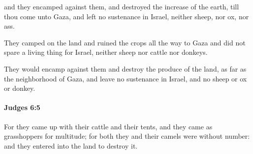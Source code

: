 			\begin{versebox}
					\item[BHS] 
					\item[ASV] and they encamped against them, and destroyed the increase of the earth, till thou come unto Gaza, and left no sustenance in Israel, neither sheep, nor ox, nor ass.
					\item[NIV] They camped on the land and ruined the crops all the way to Gaza and did not spare a living thing for Israel, neither sheep nor cattle nor donkeys.
					\item[NRSV] They would encamp against them and destroy the produce of the land, as far as the neighborhood of Gaza, and leave no sustenance in Israel, and no sheep or ox or donkey.
			\end{versebox}

		\paragraph{Judges 6:5} %
			\label{JUDGES-6-5}

			For they came up with their cattle and their tents, and they came as grasshoppers for multitude; for both they and their camels were without number: and they entered into the land to destroy it.

